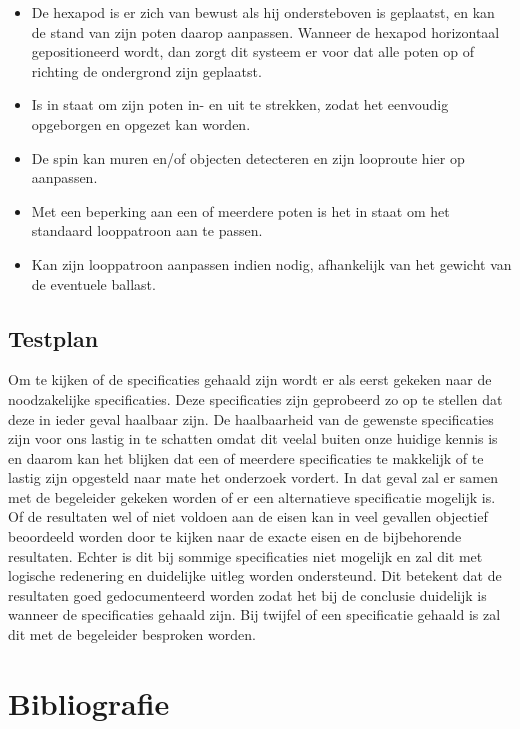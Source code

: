 \documentclass[10pt,a4paper]{article}
\begin{document}
\begin{itemize}
\setlength\itemsep{0em}
\item De hexapod is er zich van bewust als hij ondersteboven is geplaatst, en kan de stand van zijn poten daarop aanpassen. Wanneer de hexapod horizontaal gepositioneerd wordt, dan zorgt dit systeem er voor dat alle poten op of richting de ondergrond zijn geplaatst.
\item Is in staat om zijn poten in- en uit te strekken, zodat het eenvoudig opgeborgen en opgezet kan worden.
\item De spin kan muren en/of objecten detecteren en zijn looproute hier op aanpassen. 
\item Met een beperking aan een of meerdere poten is het in staat om het standaard looppatroon aan te passen.
\item Kan zijn looppatroon aanpassen indien nodig, afhankelijk van het gewicht van de eventuele ballast.
\end{itemize}

\subsection{Testplan}
Om te kijken of de specificaties gehaald zijn wordt er als eerst gekeken naar de noodzakelijke specificaties. Deze specificaties zijn geprobeerd zo op te stellen dat deze in ieder geval haalbaar zijn. De haalbaarheid van de gewenste specificaties zijn voor ons lastig in te schatten omdat dit veelal buiten onze huidige kennis is en daarom kan het blijken dat een of meerdere specificaties te makkelijk of te lastig zijn opgesteld naar mate het onderzoek vordert. In dat geval zal er samen met de begeleider gekeken worden of er een alternatieve specificatie mogelijk is.
Of de resultaten wel of niet voldoen aan de eisen kan in veel gevallen objectief beoordeeld worden door te kijken naar de exacte eisen en de bijbehorende resultaten. Echter is dit bij sommige specificaties niet mogelijk en zal dit met logische redenering en duidelijke uitleg worden ondersteund.
Dit betekent dat de resultaten goed gedocumenteerd worden zodat het bij de conclusie duidelijk is wanneer de specificaties gehaald zijn. Bij twijfel of een specificatie gehaald is zal dit met de begeleider besproken worden.



\newpage

\section{Bibliografie}


\end{document}
